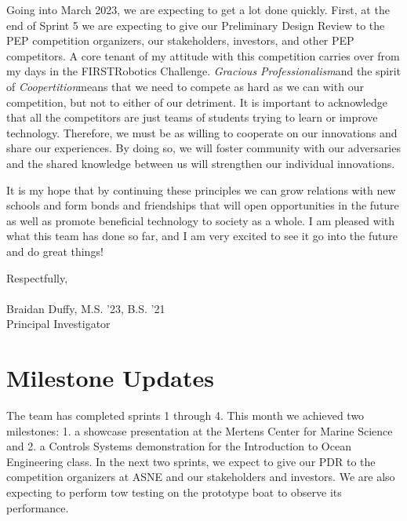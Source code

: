 \documentclass[12pt]{article}
\begin{document}
    Going into March 2023, we are expecting to get a lot done quickly.
    First, at the end of Sprint 5 we are expecting to give our Preliminary Design Review to the PEP competition organizers, our stakeholders, investors, and other PEP competitors.
    A core tenant of my attitude with this competition carries over from my days in the FIRST\textregistered Robotics Challenge. 
    \emph{Gracious Professionalism}\textregistered  and the spirit of \emph{Coopertition}\textregistered means that we need to compete as hard as we can with our competition, but not to either of our detriment.
    It is important to acknowledge that all the competitors are just teams of students trying to learn or improve technology.
    Therefore, we must be as willing to cooperate on our innovations and share our experiences.
    By doing so, we will foster community with our adversaries and the shared knowledge between us will strengthen our individual innovations.

    It is my hope that by continuing these principles we can grow relations with new schools and form bonds and friendships that will open opportunities in the future as well as promote beneficial technology to society as a whole.
    I am pleased with what this team has done so far, and I am very excited to see it go into the future and do great things!
    
    \hspace{0.2\textwidth} Respectfully, \\
    \hspace*{0.3\textwidth}\phantom{Respectfully, }\hrulefill \\
    \hspace*{0.3\textwidth}\phantom{Respectfully, }Braidan Duffy, M.S. '23, B.S. '21 \\
    \hspace*{0.3\textwidth}\phantom{Respectfully, }Principal Investigator
\pagebreak

\section{Milestone Updates} %
    The team has completed sprints 1 through 4.
This month we achieved two milestones: 1. a showcase presentation at the Mertens Center for Marine Science and 2. a Controls Systems demonstration for the Introduction to Ocean Engineering class.
In the next two sprints, we expect to give our PDR to the competition organizers at ASNE and our stakeholders and investors. 
We are also expecting to perform tow testing on the prototype boat to observe its performance.
\end{document}
